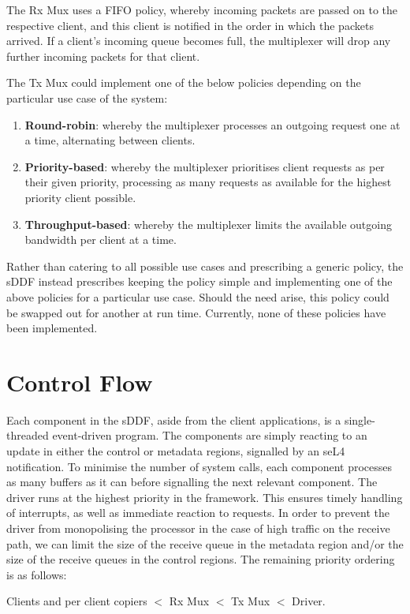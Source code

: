 The Rx Mux uses a FIFO policy, whereby incoming packets are passed on to the respective client, and this client is notified in the 
order in which the packets arrived. If a client's incoming queue becomes full, the multiplexer will drop any further
incoming packets for that client.

The Tx Mux could implement one of the below policies depending on the particular use case of the system:
\begin{enumerate}
\item \textbf{Round-robin}: whereby the multiplexer processes an outgoing request one at a time, alternating between clients.
\item \textbf{Priority-based}: whereby the multiplexer prioritises client requests as per their given priority, processing as many
requests as available for the highest priority client possible. 
\item \textbf{Throughput-based}: whereby the multiplexer limits the available outgoing bandwidth per client at a time.
\end{enumerate}
Rather than catering to all possible use cases and prescribing a generic policy, the sDDF instead prescribes 
keeping the policy simple and implementing one of the above policies for 
a particular use case. Should the need arise, this policy could be swapped out for another at run time. Currently,
none of these policies have been implemented.

\section{Control Flow}
Each component in the sDDF, aside from the client applications, is a single-threaded event-driven program. The
components are simply reacting to an update in either the control or metadata regions, signalled by an seL4 notification. 
To minimise the number of system calls, each component processes as many buffers as it can before signalling the next
relevant component.
The driver runs at the highest priority in the framework. This ensures timely handling of interrupts, as well
as immediate reaction to requests. In order to prevent the driver from monopolising the processor in the case
of high traffic on the receive path, we can limit the size of the receive queue in the metadata region and/or 
the size of the receive queues in the control regions.
The remaining priority ordering is as follows:

\centerline{Clients and per client copiers \(<\) Rx Mux \(<\) Tx Mux \(<\) Driver.}

